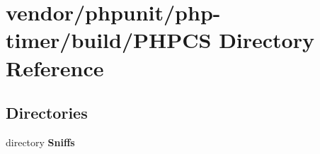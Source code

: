 \section{vendor/phpunit/php-\/timer/build/\+P\+H\+P\+C\+S Directory Reference}
\label{dir_c2db57aae31b9d30bfe83a2e624e1d17}
\subsection*{Directories}
\begin{DoxyCompactItemize}
\item 
directory {\bf Sniffs}
\end{DoxyCompactItemize}

